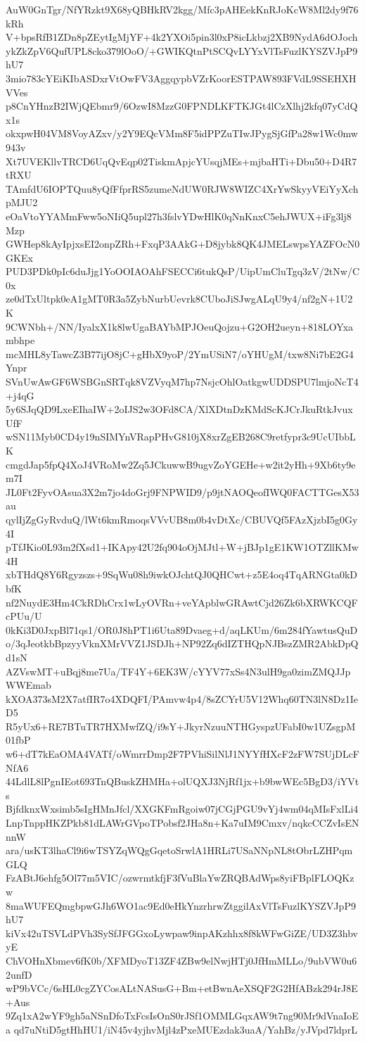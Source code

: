 AuW0GnTgr/NfYRzkt9X68yQBHkRV2kgg/Mfc3pAHEekKnRJoKcW8Ml2dy9f76kRh
V+bpsRfB1ZDn8pZEytIgMjYF+4k2YXOi5pin3l0xP8icLkbzj2XB9NydA6dOJoch
ykZkZpV6QufUPL8cko379lOoO/+GWIKQtnPtSCQvLYYxVlTsFuzlKYSZVJpP9hU7
3mio783cYEiKIbASDxrVtOwFV3AggqypbVZrKoorESTPAW893FVdL9SSEHXHVVes
p8CnYHnzB2IWjQEbmr9/6OzwI8MzzG0FPNDLKFTKJGt4lCzXlhj2kfq07yCdQx1s
okxpwH04VM8VoyAZxv/y2Y9EQcVMm8F5idPPZuTIwJPygSjGfPa28w1Wc0mw943v
Xt7UVEKllvTRCD6UqQvEqp02TiskmApjcYUsqjMEs+mjbaHTi+Dbu50+D4R7tRXU
TAmfdU6IOPTQuu8yQfFfprRS5zumeNdUW0RJW8WIZC4XrYwSkyyVEiYyXchpMJU2
eOaVtoYYAMmFww5oNIiQ5upl27h3fslvYDwHlK0qNnKnxC5ehJWUX+iFg3lj8Mzp
GWHep8kAyIpjxsEI2onpZRh+FxqP3AAkG+D8jybk8QK4JMELswpsYAZFOcN0GKEx
PUD3PDk0pIc6duJjg1YoOOIAOAhFSECCi6tukQsP/UipUmCluTgq3zV/2tNw/C0x
ze0dTxUltpk0eA1gMT0R3a5ZybNurbUevrk8CUboJiSJwgALqU9y4/nf2gN+1U2K
9CWNbh+/NN/IyalxX1k8lwUgaBAYbMPJOeuQojzu+G2OH2ueyn+818LOYxambhpe
mcMHL8yTawcZ3B77ijO8jC+gHbX9yoP/2YmUSiN7/oYHUgM/txw8Ni7bE2G4Ynpr
SVnUwAwGF6WSBGnSRTqk8VZVyqM7hp7NsjcOhlOatkgwUDDSPU7lmjoNcT4+j4qG
5y6SJqQD9LxeEIhaIW+2oIJS2w3OFd8CA/XlXDtnDzKMdScKJCrJkuRtkJvuxUfF
wSN11Myb0CD4y19nSIMYnVRapPHvG810jX8xrZgEB268C9retfypr3c9UcUIbbLK
cmgdJap5fpQ4XoJ4VRoMw2Zq5JCkuwwB9ugvZoYGEHe+w2it2yHh+9Xb6ty9em7I
JL0Ft2FyvOAsua3X2m7jo4doGrj9FNPWID9/p9jtNAOQeofIWQ0FACTTGesX53au
qylIjZgGyRvduQ/lWt6kmRmoqsVVvUB8m0b4vDtXc/CBUVQf5FAzXjzbI5g0Gy4I
pTfJKio0L93m2fXsd1+IKApy42U2fq904oOjMJtl+W+jBJp1gE1KW1OTZllKMw4H
xbTHdQ8Y6Rgyzszs+9SqWu08h9iwkOJchtQJ0QHCwt+z5E4oq4TqARNGta0kDbfK
nf2NuydE3Hm4CkRDhCrx1wLyOVRn+veYApblwGRAwtCjd26Zk6bXRWKCQFcPUu/U
0kKi3D0JxpBl71qs1/OR0J8hPT1i6Uta89Dvaeg+d/aqLKUm/6m284fYawtusQuD
o/3qJeotkbBpzyyVknXMrVVZ1JSDJh+NP92Zq6dIZTHQpNJBszZMR2AbkDpQd1sN
AZVswMT+uBqj8me7Ua/TF4Y+6EK3W/cYYV77xSs4N3ulH9ga0zimZMQJJpWWEmab
kXOA373sM2X7atfIR7o4XDQFI/PAmvw4p4/8sZCYrU5V12Whq60TN3lN8Dz1IeD5
R5yUx6+RE7BTuTR7HXMwfZQ/i9sY+JkyrNzuuNTHGyspzUFabI0w1UZsgpM01fbP
w6+dT7kEaOMA4VATf/oWmrrDmp2F7PVhiSilNlJ1NYYfHXcF2zFW7SUjDLcFNfA6
44LdlL8lPgnIEot693TnQBuskZHMHa+olUQXJ3NjRf1jx+b9bwWEc5BgD3/iYVts
BjfdknxWxsimb5sIgHMnJfcl/XXGKFmRgoiw07jCGjPGU9vYj4wm04qMIsFxlLi4
LnpTnppHKZPkb81dLAWrGVpoTPobsf2JHa8n+Ka7uIM9Cmxv/nqkcCCZvIsENnnW
ara/usKT3lhaCl9i6wTSYZqWQgGqetoSrwlA1HRLi7USaNNpNL8tObrLZHPqmGLQ
FzABtJ6ehfg5Ol77m5VIC/ozwrmtkfjF3fVuBlaYwZRQBAdWps8yiFBplFLOQKzw
8maWUFEQmgbpwGJh6WO1ac9Ed0eHkYnzrhrwZtggilAxVlTsFuzlKYSZVJpP9hU7
kiVx42uTSVLdPVh3SySfJFGGxoLywpaw9inpAKzhhx8f8kWFwGiZE/UD3Z3hbvyE
ChVOHnXbmev6fK0b/XFMDyoT13ZF4ZBw9elNwjHTj0JfHmMLLo/9ubVW0u62unfD
wP9bVCc/6sHL0cgZYCosALtNASusG+Bm+etBwnAeXSQF2G2HfABzk294rJ8E+Aus
9Zq1xA2wYF9gh5aNSnDfoTxFcsIsOnS0rJSf1OMMLGqxAW9t7ng90Mr9dVnaIoEa
qd7uNtiD5gtHhHU1/iN45v4yjhvMjl4zPxeMUEzdak3uaA/YahBz/yJVpd7ldprL
